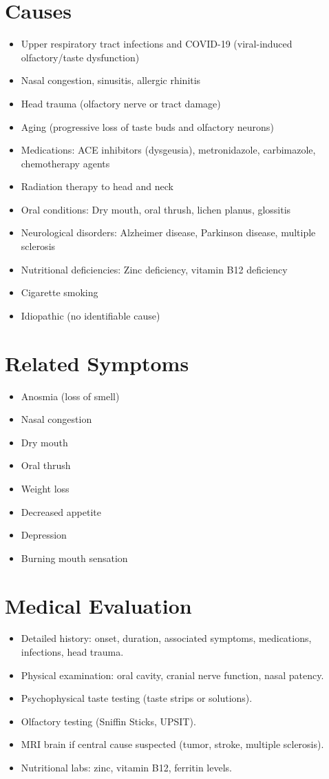 \section*{Causes}
\begin{itemize}
  \item Upper respiratory tract infections and COVID-19 (viral-induced olfactory/taste dysfunction)
  \item Nasal congestion, sinusitis, allergic rhinitis
  \item Head trauma (olfactory nerve or tract damage)
  \item Aging (progressive loss of taste buds and olfactory neurons)
  \item Medications: ACE inhibitors (dysgeusia), metronidazole, carbimazole, chemotherapy agents
  \item Radiation therapy to head and neck
  \item Oral conditions: Dry mouth, oral thrush, lichen planus, glossitis
  \item Neurological disorders: Alzheimer disease, Parkinson disease, multiple sclerosis
  \item Nutritional deficiencies: Zinc deficiency, vitamin B12 deficiency
  \item Cigarette smoking
  \item Idiopathic (no identifiable cause)
\end{itemize}

\section*{Related Symptoms}
\begin{itemize}
  \item Anosmia (loss of smell)
  \item Nasal congestion
  \item Dry mouth
  \item Oral thrush
  \item Weight loss
  \item Decreased appetite
  \item Depression
  \item Burning mouth sensation
\end{itemize}

\section*{Medical Evaluation}
\begin{itemize}
  \item Detailed history: onset, duration, associated symptoms, medications, infections, head trauma.
  \item Physical examination: oral cavity, cranial nerve function, nasal patency.
  \item Psychophysical taste testing (taste strips or solutions).
  \item Olfactory testing (Sniffin Sticks, UPSIT).
  \item MRI brain if central cause suspected (tumor, stroke, multiple sclerosis).
  \item Nutritional labs: zinc, vitamin B12, ferritin levels.
\end{itemize}

